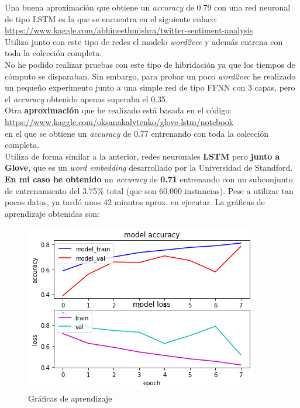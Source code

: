 \documentclass[a4paper,12pt]{report}
\begin{document}
{\setlength{\parindent}{0cm}
Una buena aproximación que obtiene un \textit{accuracy} de 0.79 con una red neuronal de tipo LSTM es la que se encuentra en el siguiente enlace:\\ }
\url{https://www.kaggle.com/abhineethmishra/twitter-sentiment-analysis}\\
Utiliza junto con este tipo de redes el modelo \textit{word2vec} y además entrena con toda la colección completa. 
\vspace{2mm}\\
No he podido realizar pruebas con este tipo de hibridación ya que los tiempos de cómputo se disparaban. Sin embargo, para probar un poco \textit{word2vec} he realizado un pequeño experimento junto a una simple red de tipo FFNN con 3 capas, pero el \textit{accuracy} obtenido apenas superaba el 0.35.
\vspace{4mm}\\
Otra \textbf{aproximación} que he realizado está basada en el código: \\
\url{https://www.kaggle.com/oksanakalytenko/glove-lstm/notebook}\\
en el que se obtiene un \textit{accuracy} de 0.77 entrenando con toda la colección completa. \\Utiliza de forma similar a la anterior, redes neuronales \textbf{LSTM} pero \textbf{junto a Glove}, que es un \textit{word embedding} desarrollado por la Universidad de Standford.
\vspace{2mm}\\
\textbf{En mi caso he obtenido} un \textit{accuracy} de \textbf{0.71} entrenando con un subconjunto de entrenamiento del 3.75\% total (que son 60.000 instancias). Pese a utilizar tan pocos datos, ya tardó unos 42 minutos aprox. en ejecutar. La gráficas de aprendizaje obtenidas son:

\begin{figure} %
    \centering
	\includegraphics[scale=0.6]{images/av1.png}
    \caption{Gráficas de aprendizaje}
\end{figure}
\end{document}
